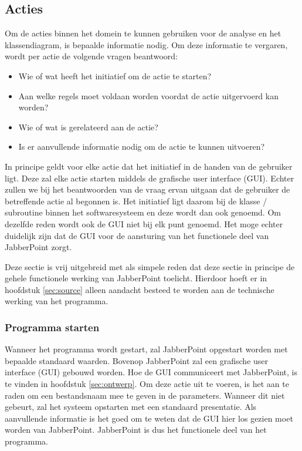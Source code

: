 \documentclass[a4paper]{article}
\newcommand{\1}[0]{\'{e}\'{e}n}
\begin{document}
\subsection{Acties}
Om de acties binnen het domein te kunnen gebruiken voor de analyse en het klassendiagram, is bepaalde informatie nodig. Om deze informatie te vergaren, wordt per actie de volgende vragen beantwoord:
\begin{itemize}[noitemsep]
\item Wie of wat heeft het initiatief om de actie te starten?
\item Aan welke regels moet voldaan worden voordat de actie uitgervoerd kan worden?
\item Wie of wat is gerelateerd aan de actie?
\item Is er aanvullende informatie nodig om de actie te kunnen uitvoeren?
\end{itemize}

In principe geldt voor elke actie dat het initiatief in de handen van de gebruiker ligt. Deze zal elke actie starten middels de grafische user interface (GUI). Echter zullen we bij het beantwoorden van de vraag ervan uitgaan dat de gebruiker de betreffende actie al begonnen is. Het initiatief ligt daarom bij de klasse / subroutine binnen het softwaresysteem en deze wordt dan ook genoemd. Om dezelfde reden wordt ook de GUI niet bij elk punt genoemd. Het moge echter duidelijk zijn dat de GUI voor de aansturing van het functionele deel van JabberPoint zorgt.

Deze sectie is vrij uitgebreid met als simpele reden dat deze sectie in principe de gehele functionele werking van JabberPoint toelicht. Hierdoor hoeft er in hoofdstuk \ref{sec:source} alleen aandacht besteed te worden aan de technische werking van het programma.

\subsubsection{Programma starten}
Wanneer het programma wordt gestart, zal JabberPoint opgestart worden met bepaalde standaard waarden. Bovenop JabberPoint zal een grafische user interface (GUI) gebouwd worden. Hoe de GUI communiceert met JabberPoint, is te vinden in hoofdstuk \ref{sec:ontwerp}. Om deze actie uit te voeren, is het aan te raden om een bestandsnaam mee te geven in de parameters. Wanneer dit niet gebeurt, zal het systeem opstarten met een standaard presentatie. Als aanvullende informatie is het goed om te weten dat de GUI hier los gezien moet worden van JabberPoint. JabberPoint is dus het functionele deel van het programma.
\end{document}
